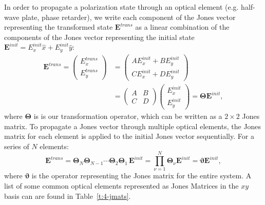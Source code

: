 In order to propagate a polarization state through an optical element (e.g. half-wave plate, phase retarder), we write each component of the Jones vector representing the transformed state $\mathbf{E}^{trans}$ as a linear combination of the components of the Jones vector representing the initial state $\mathbf{E}^{init} = E^{init}_{x}\hat{x}+E^{init}_{y}\hat{y}$:
\begin{align}
\mathbf{E}^{trans} = \left ( \begin{array}{c} E^{trans}_{x} \\ E^{trans}_{y} \end{array} \right ) &= \left ( \begin{array}{c} A E^{init}_{x} + B E^{init}_{y} \\ C E^{init}_{x}+ D E^{init}_{y} \end{array} \right ) \nonumber \\
&= \left ( \begin{array}{cc} A & B \\C & D \end{array} \right )\left ( \begin{array}{c} E^{init}_{x} \\ E^{init}_{y} \end{array} \right ) = \bm{\Theta} \mathbf{E}^{init},
\end{align}
where $\bm{\Theta}$ is is our transformation operator, which can be written as a $2 \times 2$ Jones matrix.
To propagate a Jones vector through multiple optical elements, the Jones matrix for each element is applied to the initial Jones vector sequentially.
For a series of $N$ elements:
\begin{equation}
\mathbf{E}^{trans} = \bm{\Theta}_N \bm{\Theta}_{N-1} \cdots \bm{\Theta}_2 \bm{\Theta}_1\, \mathbf{E}^{init} = \prod\limits^N_{\nu=1} \bm{\Theta}_{\nu} \mathbf{E}^{init} = \bm{\vartheta} \mathbf{E}^{init},
\end{equation}
where $\bm{\vartheta}$ is the operator representing the Jones matrix for the entire system.
A list of some common optical elements represented as Jones Matrices in the $xy$ basis can are found in Table~\ref{t:4-jmats}.

